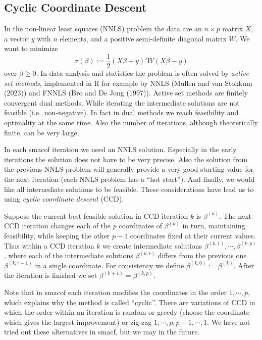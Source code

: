 \documentclass[
  12pt,
]{article}
\begin{document}
\subsection{Cyclic Coordinate Descent}\label{cyclic-coordinate-descent}

In the non-linear least squares (NNLS) problem the data are an \(n\times p\) matrix
\(X\), a vector \(y\) with \(n\) elements, and a positive semi-definite diagonal matrix
\(W\). We want to minimize
\[
\sigma(\beta):=\frac12(X\beta-y)'W(X\beta-y)
\]
over \(\beta\geq 0\). In data analysis and statistics the problem is often solved by
\emph{active set methods}, implemented in R for example by NNLS (Mullen and van Stokkum (2023)) and FNNLS (Bro and De Jong (1997)). Active set methods are finitely convergent dual methods. While iterating the intermediate solutions are not feasible (i.e.~non-negative). In fact
in dual methods we reach feasibility and optimality at the same time. Also the number of iterations, although theoretically finite, can be very large.

In each smacof iteration we need an NNLS solution. Especially in the early iterations the solution does not have to be very precise. Also the solution from the previous
NNLS problem will generally provide a very good starting value for the next iteration
(each NNLS problem has a ``hot start''). And finally, we would like all internediate solutions to be feasible. These considerations have lead us to using
\emph{cyclic coordinate descent} (CCD).

Suppose the current best feasible solution in CCD iteration \(k\) is \(\beta^{(k)}\).
The next CCD iteration changes each of the \(p\) coordinates of \(\beta^{(k)}\) in turn, maintaining feasibility, while keeping the other \(p-1\) coordinates fixed at their current values. Thus within a CCD iteration \(k\) we create intermediate solutions \(\beta^{(k,1)},\cdots,\beta^{(k,p)}\), where each of the intermediate solutions \(\beta^{(k,r)}\) differs from the previous one \(\beta^{(k,r-1)}\) in a single coordinate.
For consistency we define \(\beta^{(k,0)}:=\beta^{(k)}\). After the iteration is finished
we set \(\beta^{(k+1)}=\beta^{(k,p)}\).

Note that in smacof each iteration modifies the coordinates in the order \(1,\cdots,p\), which explains why the method is called ``cyclic''. There are variations of CCD in which the order within an iteration is random or greedy (choose the coordinate which gives the largest improvement) or zig-zag \(1,\cdots,p,p-1,\cdots,1\). We have not tried out these alternatives in smacf, but we may in the future.
\end{document}
